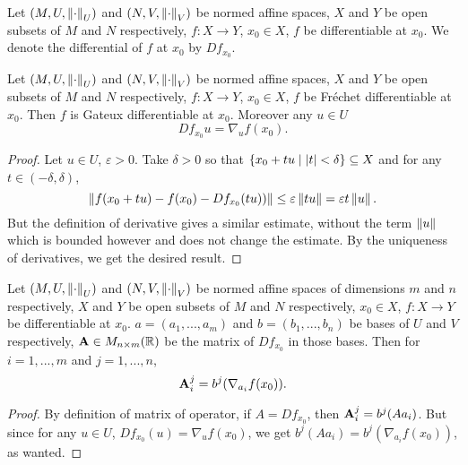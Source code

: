 \begin{notation}
  Let
    $(M, U, \left\lVert\cdot\right\rVert_U)$ and $(N, V, \left\lVert\cdot\right\rVert_V)$
      be normed affine spaces,
    $X$ and $Y$ be open subsets of $M$ and $N$ respectively,
    $f \colon X \to Y$,
    $x_0 \in X$,
    $f$ be differentiable at $x_0$.
  We denote the differential of $f$ at $x_0$ by $D f_{x_0}$.
\end{notation}
\begin{proposition}
  Let
    $(M, U, \left\lVert\cdot\right\rVert_U)$ and $(N, V, \left\lVert\cdot\right\rVert_V)$
      be normed affine spaces,
    $X$ and $Y$ be open subsets of $M$ and $N$ respectively,
    $f \colon X \to Y$,
    $x_0 \in X$,
    $f$ be Fr\'{e}chet differentiable at $x_0$.
  Then $f$ is Gateux differentiable at $x_0$.
  Moreover any $u \in U$
  \begin{equation}
    D f_{x_0} u = \nabla_u f(x_0).
  \end{equation}
\end{proposition}
\begin{proof}
  Let $u \in U$, $\varepsilon > 0$.
  Take $\delta > 0$ so that
  $\left\{ x_0 + t u \mid \left\lvert t\right\rvert < \delta \right\} \subseteq X$
  and for any $t \in (- \delta, \delta)$,
  \begin{equation}
    \left\lVert f(x_0 + t u) - f(x_0) - D f_{x_0}(t u))\right\rVert
    \leq \varepsilon \left\lVert t u\right\rVert
    = \varepsilon t \left\lVert u\right\rVert.
  \end{equation}
  But the definition of derivative gives a similar estimate, without the term
  $\left\lVert u\right\rVert$ which is bounded however and does not change the estimate.
  By the uniqueness of derivatives, we get the desired result.
\end{proof}
\begin{corollary}
  Let
    $(M, U, \left\lVert\cdot\right\rVert_U)$ and $(N, V, \left\lVert\cdot\right\rVert_V)$
      be normed affine spaces of dimensions $m$ and $n$ respectively,
    $X$ and $Y$ be open subsets of $M$ and $N$ respectively,
    $x_0 \in X$,
    $f \colon X \to Y$ be differentiable at $x_0$.
    $a = (a_1, ..., a_m)$ and $b = (b_1, ..., b_n)$ be bases of $U$ and $V$
      respectively,
    ${\bf A} \in M_{n \times m}(\mathbb{R})$ be the matrix of $D f_{x_0}$ in
    those bases.
  Then for $i = 1, ..., m$ and $j = 1, ..., n$,
  \begin{equation}
    {\bf A}^j_i = b^j(\nabla_{a_i} f(x_0)).
  \end{equation}
\end{corollary}
\begin{proof}
  By definition of matrix of operator, if $A = D f_{x_0}$, then
  ${\bf A}^j_i = b^j(A a_i)$.
  But since for any $u \in U$, $D f_{x_0}(u) = \nabla_u f(x_0)$, we get
  $b^j(A a_i) = b^j(\nabla_{a_i} f(x_0))$, as wanted.
\end{proof}
